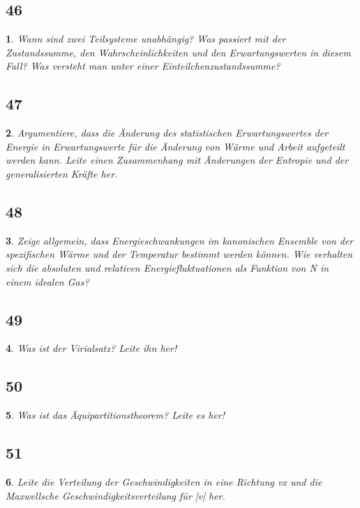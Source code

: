 \documentclass[12pt,a4paper]{report}
\newtheorem{myfrag}{}%
\begin{document}
\subsection{46}
\begin{myfrag}
Wann sind zwei Teilsysteme unabhängig? Was passiert mit der Zustandssumme,
den Wahrscheinlichkeiten und den Erwartungswerten in diesem Fall? Was
versteht man unter einer Einteilchenzustandssumme?
\end{myfrag}
\subsection{47}
\begin{myfrag}
Argumentiere, dass die Änderung des statistischen Erwartungswertes der Energie
in Erwartungswerte für die Änderung von Wärme und Arbeit aufgeteilt werden
kann. Leite einen Zusammenhang mit Änderungen der Entropie und der
generalisierten Kräfte her.
\end{myfrag}
\subsection{48}
\begin{myfrag}
Zeige allgemein, dass Energieschwankungen im kanonischen Ensemble von der
spezifischen Wärme und der Temperatur bestimmt werden können. Wie verhalten
sich die absoluten und relativen Energiefluktuationen als Funktion von N in einem
idealen Gas?
\end{myfrag}
\subsection{49}
\begin{myfrag}
Was ist der Virialsatz? Leite ihn her!
\end{myfrag}
\subsection{50}
\begin{myfrag}
Was ist das Äquipartitionstheorem? Leite es her!
\end{myfrag}
\subsection{51}
\begin{myfrag}
Leite die Verteilung der Geschwindigkeiten in eine Richtung vx und die
Maxwellsche Geschwindigkeitsverteilung für |v| her.
\end{myfrag}
\end{document}
